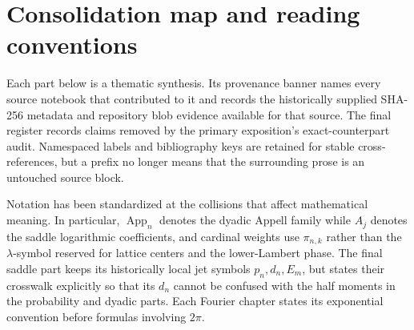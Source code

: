 \documentclass[11pt,oneside]{article}
\theoremstyle{definition}
\theoremstyle{remark}
\begin{document}
\clearpage
\begingroup
\pagestyle{plain}
\tableofcontents
\clearpage
\endgroup

\section*{Consolidation map and reading conventions}
Each part below is a thematic synthesis.  Its provenance banner names every source notebook
that contributed to it and records the historically supplied SHA-256 metadata and repository
blob evidence available for that source.  The final register records claims removed by the
primary exposition's exact-counterpart audit.  Namespaced labels and bibliography keys are
retained for stable cross-references, but a prefix no longer means that the surrounding prose
is an untouched source block.

Notation has been standardized at the collisions that affect mathematical meaning.  In
particular, \(\operatorname{App}_n\) denotes the dyadic Appell family while \(A_j\) denotes
the saddle logarithmic coefficients, and cardinal weights use \(\pi_{n,k}\) rather than the
\(\lambda\)-symbol reserved for lattice centers and the lower-Lambert phase.  The final
saddle part keeps its historically local jet symbols \(p_n,d_n,E_m\), but states their
crosswalk explicitly so that its \(d_n\) cannot be confused with the half moments in the
probability and dyadic parts.  Each Fourier chapter states its exponential convention before
formulas involving \(2\pi\).
\end{document}
